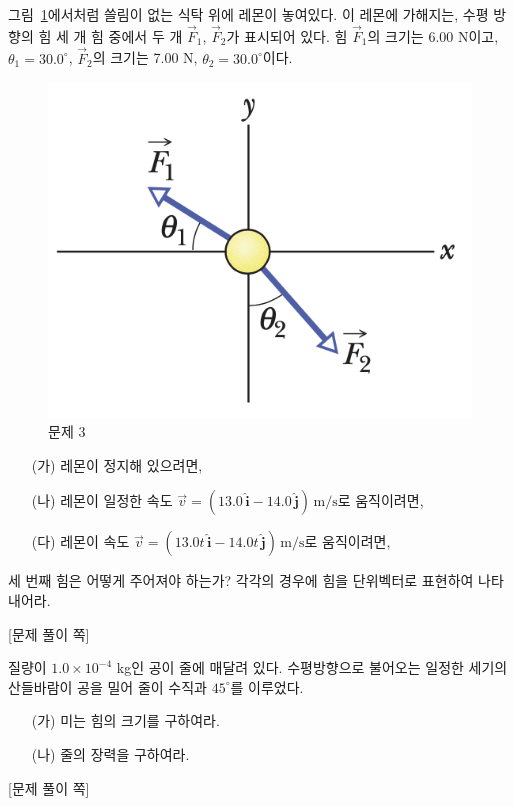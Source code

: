 \documentclass[floatfix,nofootinbib,superscriptaddress,fleqn,preprint]{revtex4}
\begin{document}
 그림~\ref{fig:3}에서처럼 쓸림이 없는 식탁 위에 레몬이 놓여있다. 이
 레몬에 가해지는, 수평 방향의 힘 세 개 힘 중에서  두 개 $\vec{F}_1$,
 $\vec{F}_2$가 표시되어 있다. 힘 $\vec{F}_1$의 크기는 6.00 N이고,
$\theta_1=30.0^\circ$, $\vec{F}_2$의 크기는 7.00 N,
$\theta_2=30.0^\circ$이다. 
\begin{figure}[ht]
  \centering
\includegraphics[scale=0.6]{Qfig6-3-20220316.png}  
  \caption{문제 3}
  \label{fig:3}
\end{figure}
\begin{itemize}
\item[(가)] 레몬이 정지해 있으려면,
\item[(나)] 레몬이 일정한 속도 $\vec{v} =(13.0\,\hat{\bm{i}} -
  14.0\,\hat{\bm{j}})\,\mathrm{m/s}$로 움직이려면, 
\item[(다)] 레몬이 속도 $\vec{v} =(13.0t\,\hat{\bm{i}} -
  14.0t\,\hat{\bm{j}})\,\mathrm{m/s}$로 움직이려면, 
\end{itemize}
세 번째 힘은 어떻게 주어져야 하는가? 각각의 경우에 힘을 단위벡터로
표현하여 나타내어라. 
 
\newpage

{\color{gray} [문제 풀이 쪽]}

\newpage

질량이 $1.0\times 10^{-4}$ kg인 공이 줄에 매달려 있다. 수평방향으로
불어오는 일정한 세기의 산들바람이 공을 밀어 줄이 수직과 $45^\circ$를
이루었다.
\begin{itemize}
\item[(가)] 미는 힘의 크기를 구하여라.
\item[(나)] 줄의 장력을 구하여라.
\end{itemize}
\newpage

{\color{gray} [문제 풀이 쪽]}

\newpage
\end{document}
